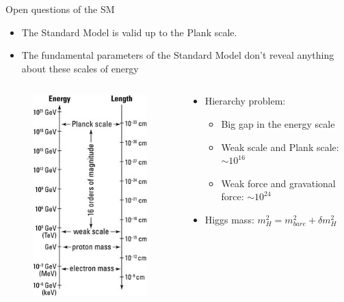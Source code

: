 \documentclass[10pt]{beamer}
\begin{document}
\begin{frame}{Open questions of the SM}
    \begin{itemize}
        \item The Standard Model is valid up to the Plank scale.
        \item The fundamental parameters of the Standard Model don’t reveal anything about these scales of energy
    \end{itemize}
    \begin{columns}
        \begin{column}{0.3\textwidth}
            \begin{figure}
                \includegraphics[scale=0.4]{figures/energy_scale.jpg}
            \end{figure}
        \end{column}
        \begin{column}{0.7\textwidth}
             \begin{itemize}
                \item Hierarchy problem:
                \begin{itemize}
                    \item Big gap in the energy scale
                    \item Weak scale and Plank scale: $\sim 10^{16}$
                    \item Weak force and gravational force: $\sim 10^{24}$
                \end{itemize}
                \item Higgs mass: $m^2_H = m^2_{bare} + \delta m^2_H$

\end{itemize}
\end{column}
\end{columns}
\end{frame}
\end{document}

